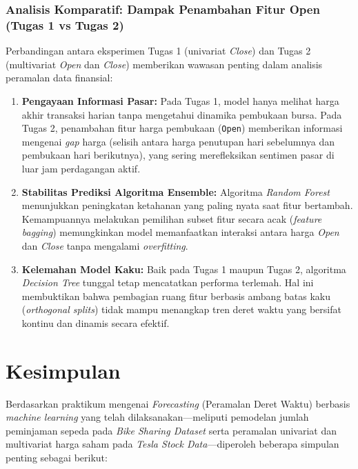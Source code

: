 \subsection{Analisis Komparatif: Dampak Penambahan Fitur Open (Tugas 1 vs Tugas 2)}
Perbandingan antara eksperimen Tugas 1 (univariat \textit{Close}) dan Tugas 2 (multivariat \textit{Open} dan \textit{Close}) memberikan wawasan penting dalam analisis peramalan data finansial:
\begin{enumerate}
    \item \textbf{Pengayaan Informasi Pasar:} Pada Tugas 1, model hanya melihat harga akhir transaksi harian tanpa mengetahui dinamika pembukaan bursa. Pada Tugas 2, penambahan fitur harga pembukaan (\texttt{Open}) memberikan informasi mengenai \textit{gap} harga (selisih antara harga penutupan hari sebelumnya dan pembukaan hari berikutnya), yang sering merefleksikan sentimen pasar di luar jam perdagangan aktif.
    \item \textbf{Stabilitas Prediksi Algoritma Ensemble:} Algoritma \textit{Random Forest} menunjukkan peningkatan ketahanan yang paling nyata saat fitur bertambah. Kemampuannya melakukan pemilihan subset fitur secara acak (\textit{feature bagging}) memungkinkan model memanfaatkan interaksi antara harga \textit{Open} dan \textit{Close} tanpa mengalami \textit{overfitting}.
    \item \textbf{Kelemahan Model Kaku:} Baik pada Tugas 1 maupun Tugas 2, algoritma \textit{Decision Tree} tunggal tetap mencatatkan performa terlemah. Hal ini membuktikan bahwa pembagian ruang fitur berbasis ambang batas kaku (\textit{orthogonal splits}) tidak mampu menangkap tren deret waktu yang bersifat kontinu dan dinamis secara efektif.
\end{enumerate}

\chapter{Kesimpulan}
\label{chap:kesimpulan}
Berdasarkan praktikum mengenai \textit{Forecasting} (Peramalan Deret Waktu) berbasis \textit{machine learning} yang telah dilaksanakan—meliputi pemodelan jumlah peminjaman sepeda pada \textit{Bike Sharing Dataset} serta peramalan univariat dan multivariat harga saham pada \textit{Tesla Stock Data}—diperoleh beberapa simpulan penting sebagai berikut:

